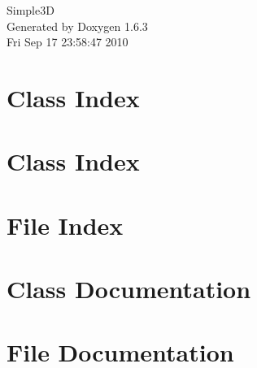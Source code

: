 \documentclass[a4paper]{book}
\begin{document}
\hypersetup{pageanchor=false}
\begin{titlepage}
\vspace*{7cm}
\begin{center}
{\Large Simple3D }\\
\vspace*{1cm}
{\large Generated by Doxygen 1.6.3}\\
\vspace*{0.5cm}
{\small Fri Sep 17 23:58:47 2010}\\
\end{center}
\end{titlepage}
\clearemptydoublepage
{}
\tableofcontents
\clearemptydoublepage
{}
\hypersetup{pageanchor=true}
\chapter{Class Index}

\chapter{Class Index}

\chapter{File Index}

\chapter{Class Documentation}












\chapter{File Documentation}
























\printindex
\end{document}
